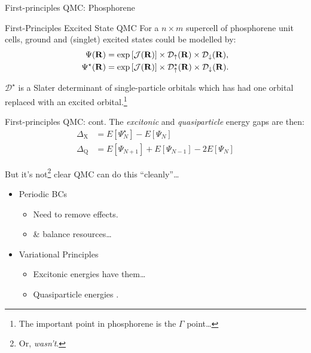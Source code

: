 \documentclass[12pt, pdf, hyperref={draft}, usenames, dvipsnames]{beamer}
\newcommand{\red}[1]{{\bf\color{LancsRed}{#1}}}
\newcommand{\green}[1]{{\bf\color{ForestGreen}{#1}}}
\begin{document}
\begin{frame}{First-principles QMC\@: Phosphorene}

\begin{block}{First-Principles Excited State QMC}
For a $n\times m$ supercell of phosphorene unit
cells, ground and (singlet) excited states could be modelled by:
\begin{align}
  \Psi({\bf R}) &= \exp{\left[ \mathcal{J}({\bf R}) \right]} \times
  \mathcal{D}_{\uparrow}({\bf R}) \times \mathcal{D}_{\downarrow}({\bf R}),
  \nonumber \\
  \Psi^{\star}({\bf R}) &= \exp{\left[ \mathcal{J}({\bf R}) \right]} \times
  \mathcal{D}^{\star}_{\uparrow}({\bf R}) \times \mathcal{D}_{\downarrow}({\bf
  R}).
\end{align}

$\mathcal{D}^{\star}$ is a Slater determinant of single-particle orbitals which
has had one orbital replaced with an excited orbital.\footnote{The important
point in phosphorene is the $\Gamma$ point\ldots}
\end{block}
\end{frame}

\begin{frame}{First-principles QMC\@: cont.}
The \textit{excitonic} and \textit{quasiparticle} energy gaps are then:
\begin{align}
  \Delta_{\text{X}} &= E \left[ \Psi^{\star}_N \right] - E \left[ \Psi_N \right]
  \nonumber \\
  \Delta_{\text{Q}} &= E \left[ \Psi_{N+1} \right] + E\left[ \Psi_{N-1} \right]
  - 2 E\left[ \Psi_N \right]
\end{align}
\vspace*{-.5cm}
\begin{block}{But it's not\footnote{Or, \textit{wasn't}.} clear QMC can
do this ``cleanly''\ldots}
\begin{minipage}[t]{0.45\textwidth}
\begin{itemize}
  \item Periodic BCs
  \begin{itemize}
    \item Need to remove \red{finite-size} effects.
    \item \& balance resources\ldots
  \end{itemize}
\end{itemize}
\end{minipage}%
\hfill
\begin{minipage}[t]{0.45\textwidth}
\begin{itemize}
  \item Variational Principles
  \begin{itemize}
    \item Excitonic energies \red{don't} have them\ldots
    \item Quasiparticle energies \green{do}.
  \end{itemize}
\end{itemize}
\end{minipage}%
\end{block}

\end{frame}
\end{document}
